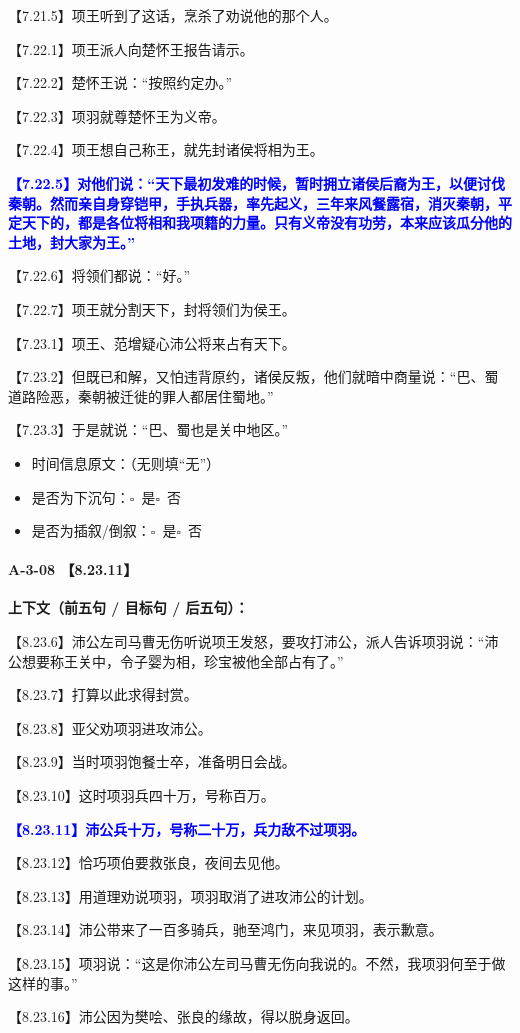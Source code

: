 \documentclass[fontset=none,11pt,a4paper]{ctexart}
\newcommand{\answerline}[1]{\underline{\hspace{#1}}}
\newcommand{\choicebox}[1]{$\square$~#1}
\begin{document}
\noindent 【7.21.5】项王听到了这话，烹杀了劝说他的那个人。\par
\noindent 【7.22.1】项王派人向楚怀王报告请示。\par
\noindent 【7.22.2】楚怀王说：“按照约定办。”\par
\noindent 【7.22.3】项羽就尊楚怀王为义帝。\par
\noindent 【7.22.4】项王想自己称王，就先封诸侯将相为王。\par
\noindent \textcolor{blue}{\textbf{【7.22.5】对他们说：“天下最初发难的时候，暂时拥立诸侯后裔为王，以便讨伐秦朝。然而亲自身穿铠甲，手执兵器，率先起义，三年来风餐露宿，消灭秦朝，平定天下的，都是各位将相和我项籍的力量。只有义帝没有功劳，本来应该瓜分他的土地，封大家为王。”}}\par
\noindent 【7.22.6】将领们都说：“好。”\par
\noindent 【7.22.7】项王就分割天下，封将领们为侯王。\par
\noindent 【7.23.1】项王、范增疑心沛公将来占有天下。\par
\noindent 【7.23.2】但既已和解，又怕违背原约，诸侯反叛，他们就暗中商量说：“巴、蜀道路险恶，秦朝被迁徙的罪人都居住蜀地。”\par
\noindent 【7.23.3】于是就说：“巴、蜀也是关中地区。”\par

\begin{itemize}
  \item 时间信息原文：\answerline{7.5cm}（无则填“无”）
  \item 是否为下沉句：\choicebox{是}\quad \choicebox{否}
  \item 是否为插叙/倒叙：\choicebox{是}\quad \choicebox{否}
\end{itemize}

\paragraph{A-3-08 \quad 【8.23.11】}
\textbf{上下文（前五句 / 目标句 / 后五句）：}

\noindent 【8.23.6】沛公左司马曹无伤听说项王发怒，要攻打沛公，派人告诉项羽说：“沛公想要称王关中，令子婴为相，珍宝被他全部占有了。”\par
\noindent 【8.23.7】打算以此求得封赏。\par
\noindent 【8.23.8】亚父劝项羽进攻沛公。\par
\noindent 【8.23.9】当时项羽饱餐士卒，准备明日会战。\par
\noindent 【8.23.10】这时项羽兵四十万，号称百万。\par
\noindent \textcolor{blue}{\textbf{【8.23.11】沛公兵十万，号称二十万，兵力敌不过项羽。}}\par
\noindent 【8.23.12】恰巧项伯要救张良，夜间去见他。\par
\noindent 【8.23.13】用道理劝说项羽，项羽取消了进攻沛公的计划。\par
\noindent 【8.23.14】沛公带来了一百多骑兵，驰至鸿门，来见项羽，表示歉意。\par
\noindent 【8.23.15】项羽说：“这是你沛公左司马曹无伤向我说的。不然，我项羽何至于做这样的事。”\par
\noindent 【8.23.16】沛公因为樊哙、张良的缘故，得以脱身返回。\par
\end{document}
